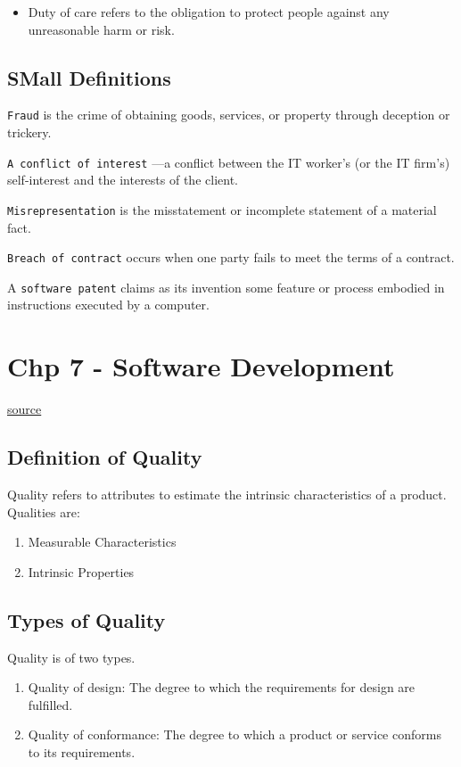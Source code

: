 \documentclass[11pt]{article}
\begin{document}
\begin{itemize}
\item Duty of care refers to the obligation to protect people against any unreasonable harm or risk.
\end{itemize}
\subsection{SMall Definitions}
\label{sec:org47ada6c}
\texttt{Fraud} is the crime of obtaining goods, services, or property through deception or trickery.

\texttt{A conflict of interest} —a conflict between the IT worker’s (or the IT firm’s) self-interest and the interests of the client.

\texttt{Misrepresentation} is the misstatement or incomplete statement of a material fact.

\texttt{Breach of contract} occurs when one party fails to meet the terms of a contract.

A \texttt{software patent} claims as its invention some feature or process embodied in instructions executed by a computer.

\section{Chp 7 - Software Development}
\label{sec:org2ac8ded}
\href{https://docs.google.com/document/d/1HFdy68xJJUp1OHd-5r7oob6gQZFAFt\_rcoKgP89fubE/edit?usp=sharing}{source}
\subsection{Definition of Quality}
\label{sec:org341b2f9}
Quality refers to attributes to estimate the intrinsic characteristics of a product.
Qualities are:
\begin{enumerate}
\item Measurable Characteristics
\item Intrinsic Properties
\end{enumerate}

\subsection{Types of Quality}
\label{sec:org9900b86}
Quality is of two types.
\begin{enumerate}
\item Quality of design: The degree to which the requirements for design are fulfilled.
\item Quality of conformance: The degree to which a product or service conforms to its requirements.
\end{enumerate}
\end{document}
